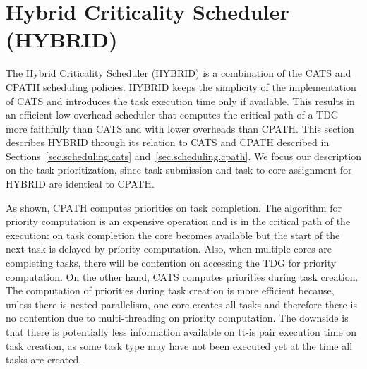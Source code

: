 \section{Hybrid Criticality Scheduler (HYBRID)}
\label{sec.scheduling.hybrid}

The Hybrid Criticality Scheduler (HYBRID) is a combination of the CATS and CPATH scheduling policies.
HYBRID keeps the simplicity of the implementation of CATS and introduces the task execution time only if available.
This results in an efficient low-overhead scheduler that computes the critical path of a TDG more faithfully than CATS and with lower overheads than CPATH.
This section describes HYBRID through its relation to CATS and CPATH described in Sections~\ref{sec.scheduling.cats} and~\ref{sec.scheduling.cpath}. 
We focus our description on the task prioritization, since task submission and task-to-core assignment for HYBRID are identical to CPATH.

As shown, CPATH computes priorities on task completion. 
The algorithm for priority computation is an expensive operation and is in the critical path of the execution:
on task completion the core becomes available but the start of the next task is delayed by priority computation.
Also, when multiple cores are completing tasks, there will be contention on accessing the TDG for priority computation.
On the other hand, CATS computes priorities during task creation.
The computation of priorities during task creation is more efficient because, unless there is nested parallelism, one core creates all tasks and therefore there is no contention due to multi-threading on priority computation. 
The downside is that there is potentially less information available on tt-is pair execution time on task creation, as some task type may have not been executed yet at the time all tasks are created.


